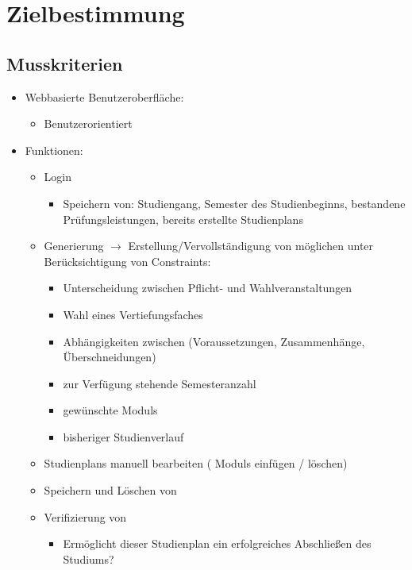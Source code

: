 \section{Zielbestimmung}

\subsection{Musskriterien}
\begin{itemize}[nosep]
	\item Webbasierte Benutzeroberfläche:
	\begin{itemize}[nosep]
		\item Benutzerorientiert 
	\end{itemize}
	\item Funktionen:
	\begin{itemize}[nosep]
		\item Login
			\begin{itemize}[nosep]
					\item Speichern von: \gls{Studiengang}, \gls{Semester des Studienbeginns}, bestandene Prüfungsleistungen, bereits erstellte \glspl{Studienplan}
				\end{itemize}
		\item \gls{Generierung} $\rightarrow$ Erstellung/Vervollständigung von möglichen  unter Berücksichtigung von \glspl{Constraint}:
		\begin{itemize}[nosep]
			\item Unterscheidung zwischen Pflicht- und Wahlveranstaltungen
			\item Wahl eines Vertiefungsfaches
			\item Abhängigkeiten zwischen  (Voraussetzungen, Zusammenhänge, Überschneidungen)
			\item zur Verfügung stehende Semesteranzahl
			\item gewünschte \glspl{Modul}
			\item bisheriger Studienverlauf
			\end{itemize}
		\item \glspl{Studienplan} manuell bearbeiten ( \glspl{Modul} einfügen / löschen)
		\item Speichern und Löschen von 
		\item \gls{Verifizierung} von 
		\begin{itemize}[nosep]
			\item Ermöglicht dieser \gls{Studienplan} ein erfolgreiches Abschließen des Studiums?

\end{itemize}
\end{itemize}
\end{itemize}
